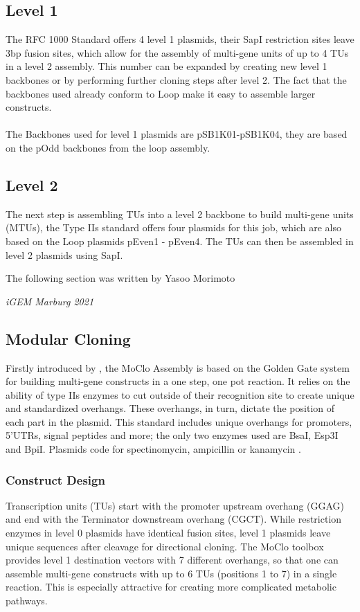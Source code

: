 \subsection*{Level 1}
The RFC 1000 Standard offers 4 level 1 plasmids, their SapI restriction sites leave 3bp fusion sites, which allow for the assembly of multi-gene units of up to 4 TUs in a level 2 assembly. This number can be expanded by creating new level 1 backbones or by performing further cloning steps after level 2. The fact that the backbones used already conform to Loop make it easy to assemble larger constructs. \\ \\
The Backbones used for level 1 plasmids are pSB1K01-pSB1K04, they are based on the pOdd backbones from the loop assembly. 

\subsection*{Level 2}
The next step is assembling TUs into a level 2 backbone to build multi-gene units (MTUs), the Type IIs standard offers four plasmids for this job, which are also based on the Loop plasmids pEven1 - pEven4. The TUs can then be assembled in level 2 plasmids using SapI. 

\epigraph{The following section was written by Yasoo Morimoto}{\textit{iGEM Marburg 2021}}
\subsection{Modular Cloning}
\noindent
Firstly introduced by \parencite{Weber2011}, the MoClo Assembly is based on the Golden Gate system \parencite{Engler2008} for building multi-gene constructs in a one step, one pot reaction. It relies on the ability of type IIs enzymes to cut outside of their recognition site to create unique and standardized overhangs. These overhangs, in turn, dictate the position of each part in the plasmid. This standard includes unique overhangs for promoters, 5’UTRs, signal peptides and more; the only two enzymes used are BsaI, Esp3I and BpiI. Plasmids code for spectinomycin, ampicillin or kanamycin \parencite{Weber2011}.

\subsubsection{Construct Design}
Transcription units (TUs) start with the promoter upstream overhang (GGAG) and end with the Terminator downstream overhang (CGCT). While restriction enzymes in level 0 plasmids have identical fusion sites, level 1 plasmids leave unique sequences after cleavage for directional cloning. The MoClo toolbox provides level 1 destination vectors with 7 different overhangs, so that one can assemble multi-gene constructs  with up to 6 TUs (positions 1 to 7) in a single reaction. This is especially attractive for creating more complicated metabolic pathways. 

